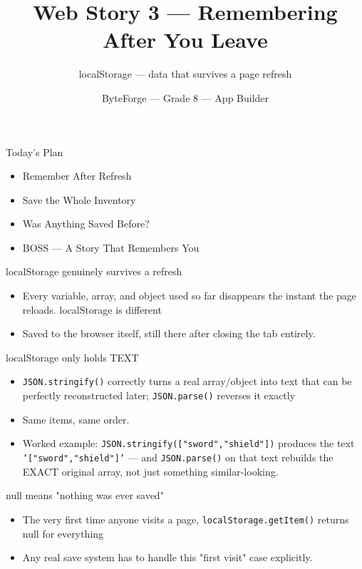 \documentclass[aspectratio=169]{beamer}
\title{Web Story 3 — Remembering After You Leave}
\subtitle{localStorage — data that survives a page refresh}
\author{ByteForge --- Grade 8 --- App Builder}
\date{}
\begin{document}
\begin{frame}
    \titlepage
\end{frame}

\begin{frame}{Today's Plan}
    \begin{itemize}
        \item Remember After Refresh
        \item Save the Whole Inventory
        \item Was Anything Saved Before?
        \item[$\bigstar$] BOSS --- A Story That Remembers You
    \end{itemize}
\end{frame}

\begin{frame}{localStorage genuinely survives a refresh}
    \large
    \begin{itemize}
        \item Every variable, array, and object used so far disappears the instant the page reloads. localStorage is different
        \item Saved to the browser itself, still there after closing the tab entirely.
    \end{itemize}
\end{frame}


\begin{frame}{localStorage only holds TEXT}
    \large
    \begin{itemize}
        \item \texttt{JSON.stringify()} correctly turns a real array/object into text that can be perfectly reconstructed later; \texttt{JSON.parse()} reverses it exactly
        \item Same items, same order.
        \item Worked example: \texttt{JSON.stringify(["sword","shield"])} produces the text \texttt{'["sword","shield"]'} — and \texttt{JSON.parse()} on that text rebuilds the EXACT original array, not just something similar-looking.
    \end{itemize}
\end{frame}


\begin{frame}{null means "nothing was ever saved"}
    \large
    \begin{itemize}
        \item The very first time anyone visits a page, \texttt{localStorage.getItem()} returns null for everything
        \item Any real save system has to handle this "first visit" case explicitly.
    \end{itemize}
\end{frame}
\end{document}
